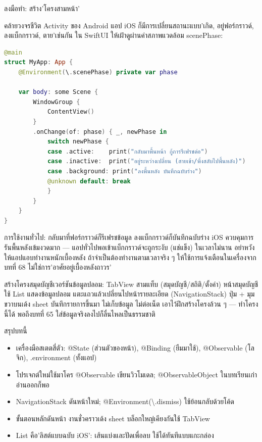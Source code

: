 \begin{tcbpractice}{ลงมือทำ: สร้าง'โครงสามหน้า'}

คล้ายวงจรชีวิต Activity ของ Android แอป iOS ก็มีการเปลี่ยนสถานะแบบ'เกิด, อยู่ฟอร์กราวด์, ลงแบ็กกราวด์, ตาย'เช่นกัน ใน SwiftUI ให้เฝ้าดูผ่านค่าสภาพแวดล้อม scenePhase:

\begin{lstlisting}[language=Swift]
@main
struct MyApp: App {
    @Environment(\.scenePhase) private var phase

    var body: some Scene {
        WindowGroup {
            ContentView()
        }
        .onChange(of: phase) { _, newPhase in
            switch newPhase {
            case .active:    print("กลับมาพื้นหน้า กู้การรีเฟรชต่อ")
            case .inactive:  print("อยู่ระหว่างเปลี่ยน (สายเข้า/พึ่งสลับไปพื้นหลัง)")
            case .background: print("ลงพื้นหลัง บันทึกฉบับร่าง")
            @unknown default: break
            }
        }
    }
}
\end{lstlisting}

การใช้งานทั่วไป: กลับมาที่ฟอร์กราวด์ก็รีเฟรชข้อมูล ลงแบ็กกราวด์ก็บันทึกฉบับร่าง iOS ควบคุมการรันพื้นหลังเข้มงวดมาก — แอปทั่วไปพอเข้าแบ็กกราวด์จะถูกระงับ (แช่แข็ง) ในเวลาไม่นาน อย่าหวังให้แอปแอบทำงานหนักเบื้องหลัง ถ้าจำเป็นต้องทำงานตามเวลาจริง ๆ ให้ใช้การแจ้งเตือนในเครื่องจากบทที่ 68 ไม่ใช่การ'อาศัยอยู่เบื้องหลังถาวร'

สร้างโครงสมุดบัญชีเวอร์ชันข้อมูลปลอม: TabView สามแท็บ (สมุดบัญชี/สถิติ/ตั้งค่า) หน้าสมุดบัญชีใช้ List แสดงข้อมูลปลอม แตะแถวแล้วเปลี่ยนไปหน้ารายละเอียด (NavigationStack) ปุ่ม + มุมขวาบนเด้ง sheet บันทึกรายการขึ้นมา ไม่เก็บข้อมูล ไม่ต่อเน็ต เอาไว้ฝึกสร้างโครงล้วน ๆ — ทำโครงนี้ได้ พอถึงบทที่ 65 ใส่ข้อมูลจริงลงไปก็ลื่นไหลเป็นธรรมชาติ

\end{tcbpractice}

\begin{tcbsummary}{สรุปบทนี้}
\begin{itemize}
  \item เครื่องมือสเตตสี่ตัว: @State (ส่วนตัวของหน้า), @Binding (ยืมมาใช้), @Observable (โลจิก), .environment (ทั้งแอป)
  \item โปรเจกต์ใหม่ใช้มาโคร @Observable เขียนวิวโมเดล; @ObservableObject ในบทเรียนเก่า อ่านออกก็พอ
  \item NavigationStack ดันหน้าใหม่; @Environment(\textbackslash{}.dismiss) ใช้ย้อนกลับด้วยโค้ด
  \item ขั้นตอนหลักดันหน้า งานชั่วคราวเด้ง sheet บล็อกใหญ่เคียงกันใช้ TabView
  \item List คือ'ลิสต์แบบฉบับ iOS': เส้นแบ่งและปัดเพื่อลบ ใช้ได้ทันทีแบบแกะกล่อง
\end{itemize}

\end{tcbsummary}
